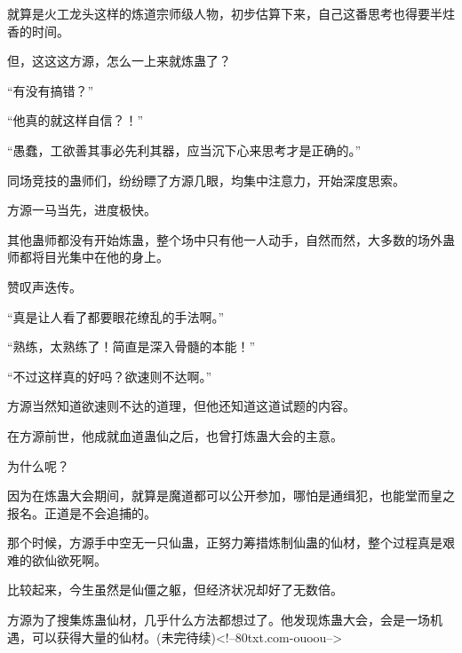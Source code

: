 \begin{this_body}
就算是火工龙头这样的炼道宗师级人物，初步估算下来，自己这番思考也得要半炷香的时间。

但，这这这方源，怎么一上来就炼蛊了？

“有没有搞错？”

“他真的就这样自信？！”

“愚蠢，工欲善其事必先利其器，应当沉下心来思考才是正确的。”

同场竞技的蛊师们，纷纷瞟了方源几眼，均集中注意力，开始深度思索。

方源一马当先，进度极快。

其他蛊师都没有开始炼蛊，整个场中只有他一人动手，自然而然，大多数的场外蛊师都将目光集中在他的身上。

赞叹声迭传。

“真是让人看了都要眼花缭乱的手法啊。”

“熟练，太熟练了！简直是深入骨髓的本能！”

“不过这样真的好吗？欲速则不达啊。”

方源当然知道欲速则不达的道理，但他还知道这道试题的内容。

在方源前世，他成就血道蛊仙之后，也曾打炼蛊大会的主意。

为什么呢？

因为在炼蛊大会期间，就算是魔道都可以公开参加，哪怕是通缉犯，也能堂而皇之报名。正道是不会追捕的。

那个时候，方源手中空无一只仙蛊，正努力筹措炼制仙蛊的仙材，整个过程真是艰难的欲仙欲死啊。

比较起来，今生虽然是仙僵之躯，但经济状况却好了无数倍。

方源为了搜集炼蛊仙材，几乎什么方法都想过了。他发现炼蛊大会，会是一场机遇，可以获得大量的仙材。(未完待续)<!--80txt.com-ouoou-->

\end{this_body}

